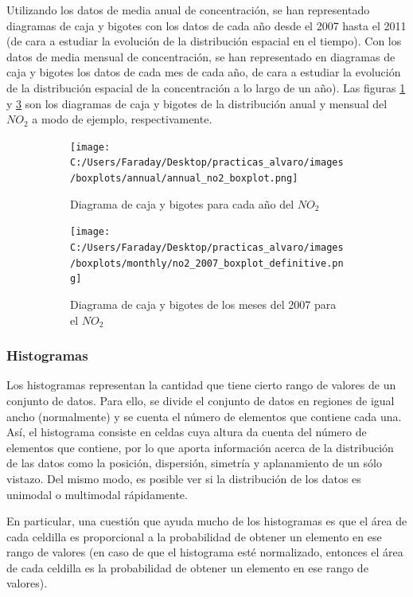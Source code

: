 \documentclass[12pt]{article}
\begin{document}
Utilizando los datos de media anual de concentración, se han representado diagramas de caja y bigotes con los datos de cada año desde el 2007 hasta el 2011 (de cara a estudiar la evolución de la distribución espacial en el tiempo). Con los datos de media mensual de concentración, se han representado en diagramas de caja y bigotes los datos de cada mes de cada año, de cara a estudiar la evolución de la distribución espacial de la concentración a lo largo de un año). Las figuras \ref{fig:box-ejem-1} y \ref{fig:box-ejem-2} son los diagramas de caja y bigotes de la distribución anual y mensual del $NO_{2}$ a modo de ejemplo, respectivamente.

\begin{figure}[H]
\centering
\begin{subfigure}[H]{0.45\textwidth}
\texttt{[image: C:/Users/Faraday/Desktop/practicas\_alvaro/images/boxplots/annual/annual\_no2\_boxplot.png]}
\caption{Diagrama de caja y bigotes para cada año del $NO_{2}$}
\label{fig:box-ejem-1}
\end{subfigure}
%
\begin{subfigure}[H]{0.45\textwidth}
\texttt{[image: C:/Users/Faraday/Desktop/practicas\_alvaro/images/boxplots/monthly/no2\_2007\_boxplot\_definitive.png]}
\caption{Diagrama de caja y bigotes de los meses del 2007 para el $NO_{2}$}
\label{fig:box-ejem-2}
\end{subfigure}
\caption{}
\end{figure}

\subsubsection{Histogramas}

Los histogramas representan la cantidad que tiene cierto rango de valores de un conjunto de datos. Para ello, se divide el conjunto de datos en regiones de igual ancho (normalmente) y se cuenta el número de elementos que contiene cada una. Así, el histograma consiste en celdas cuya altura da cuenta del número de elementos que contiene, por lo que aporta información acerca de la distribución de las datos como la posición, dispersión, simetría y aplanamiento de un sólo vistazo. Del mismo modo, es posible ver si la distribución de los datos es unimodal o multimodal rápidamente.

En particular, una cuestión que ayuda mucho de los histogramas es que el área de cada celdilla es proporcional a la probabilidad de obtener un elemento en ese rango de valores (en caso de que el histograma esté normalizado, entonces el área de cada celdilla es la probabilidad de obtener un elemento en ese rango de valores).
\end{document}

